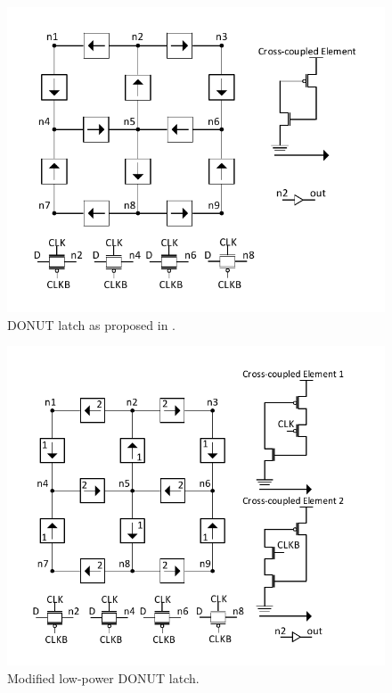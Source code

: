 \begin{figure}[!htbp]
	\centering
	\includegraphics[width=\linewidth]{Figures/DONUT}
	\caption{DONUT latch as proposed in \cite{DONUT}.}
	\label{fig:DONUT}
\end{figure}

\begin{figure}[!htbp]
	\centering
	\includegraphics[width=\linewidth]{Figures/ModDONUT}
	\caption{Modified low-power DONUT latch.}
	\label{DONUT_M}
\end{figure}